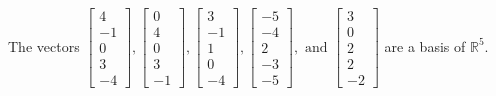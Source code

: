\begin{exercise}
\begin{exerciseStatement}
  \end{exerciseStatement}
  \begin{exerciseAnswer}
   The vectors \(\left[\begin{array}{r}
4 \\
-1 \\
0 \\
3 \\
-4
\end{array}\right] , \left[\begin{array}{r}
0 \\
4 \\
0 \\
3 \\
-1
\end{array}\right] , \left[\begin{array}{r}
3 \\
-1 \\
1 \\
0 \\
-4
\end{array}\right] , \left[\begin{array}{r}
-5 \\
-4 \\
2 \\
-3 \\
-5
\end{array}\right] , \text{ and } \left[\begin{array}{r}
3 \\
0 \\
2 \\
2 \\
-2
\end{array}\right]\) 
  	 are  a basis of \(\mathbb{R}^5\).
  


  \end{exerciseAnswer}
\end{exercise}